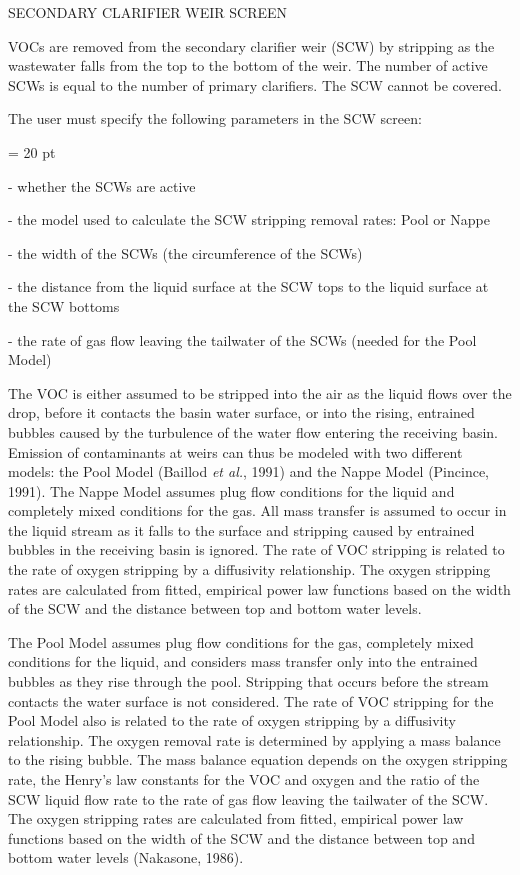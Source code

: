 SECONDARY CLARIFIER WEIR SCREEN

VOCs are removed from the secondary clarifier weir (SCW) by stripping as the
wastewater falls from the top to the bottom of the weir.  The number of active
SCWs is equal to the number of primary clarifiers. The SCW cannot be covered.

The user must specify the following parameters in the SCW screen:

{\parindent = 20 pt

\item{-} whether the SCWs are active 

\item{-} the model used to calculate the SCW stripping removal rates: Pool or
Nappe

\item{-} the width of the SCWs (the circumference of the SCWs)

\item{-} the distance from the liquid surface at the SCW tops to the liquid
surface at the SCW bottoms 

\item{-} the rate of gas flow leaving the tailwater of the SCWs (needed for the
Pool Model)

}

The VOC is either assumed to be stripped into the air as the liquid flows over
the drop, before it contacts the basin water surface, or into the rising,
entrained bubbles caused by the turbulence of the water flow entering the
receiving basin.  Emission of contaminants at weirs can thus be modeled with
two different models: the Pool Model (Baillod  {\it et al.}, 1991) and the
Nappe Model (Pincince, 1991).  The Nappe Model assumes plug flow conditions for
the liquid and completely mixed conditions for the gas.   All mass transfer is
assumed to occur in the liquid stream as it falls to the surface and stripping
caused by entrained bubbles in the receiving basin is ignored.  The rate of VOC
stripping is related to the rate of oxygen stripping by a diffusivity
relationship.  The oxygen stripping rates are calculated from fitted, empirical
power law functions based on the width of the SCW and the distance between top
and bottom water levels.

The Pool Model assumes plug flow conditions for the gas, completely mixed
conditions for the liquid, and considers mass transfer only into the entrained
bubbles as they rise through the pool.  Stripping that occurs before the stream
contacts the water surface is not considered.  The rate of VOC stripping for
the Pool Model also is related to the rate of oxygen stripping by a diffusivity
relationship.  The oxygen removal rate is determined by applying a mass balance
to the rising bubble. The mass balance equation depends on the oxygen stripping
rate, the Henry's law constants for the VOC and oxygen and the ratio of the SCW
liquid flow rate to the rate of gas flow leaving the tailwater of the SCW. The
oxygen stripping rates are calculated from fitted, empirical power law
functions based on the width of the SCW and the distance between top and bottom
water levels (Nakasone, 1986). 

